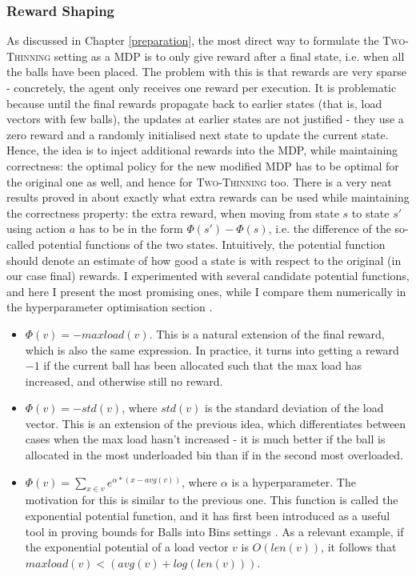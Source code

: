 \subsubsection{Reward Shaping} \label{rewardshaping}


As discussed in Chapter \ref{preparation}, the most direct way to formulate the \textsc{Two-Thinning} setting as a MDP is to only give reward after a final state, i.e. when all the balls have been placed. The problem with this is that rewards are very sparse - concretely, the agent only receives one reward per execution. It is problematic because until the final rewards propagate back to earlier states (that is, load vectors with few balls), the updates at earlier states are not justified - they use a zero reward and a randomly initialised next state to update the current state. Hence, the idea is to inject additional rewards into the MDP, while maintaining correctness: the optimal policy for the new modified MDP has to be optimal for the original one as well, and hence for \textsc{Two-Thinning} too. There is a very neat results proved in \cite{ng1999rewardshaping} about exactly what extra rewards can be used while maintaining the correctness property: the extra reward, when moving from state $s$ to state $s'$ using action $a$ has to be in the form $\Phi(s')-\Phi(s)$, i.e. the difference of the so-called potential functions of the two states. Intuitively, the potential function should denote an estimate of how good a state is with respect to the original (in our case final) rewards. I experimented with several candidate potential functions, and here I present the most promising ones, while I compare them numerically in the hyperparameter optimisation section .


\begin{itemize}
    \item
    $\Phi(v)=-maxload(v)$. This is a natural extension of the final reward, which is also the same expression. In practice, it turns into getting a reward $-1$ if the current ball has been allocated such that the max load has increased, and otherwise still no reward.
    \item
    $\Phi(v)=-std(v)$, where $std(v)$ is the standard deviation of the load vector. This is an extension of the previous idea, which differentiates between cases when the max load hasn't increased - it is much better if the ball is allocated in the most underloaded bin than if in the second most overloaded.
    \item
    $\Phi(v)=\sum_{x\in v} e^{\alpha * (x - avg(v))}$, where $\alpha$ is a hyperparameter. The motivation for this is similar to the previous one. This function is called the exponential potential function, and it has first been introduced as a useful tool in proving bounds for Balls into Bins settings \cite{ghosh1999exponentialpotential} . As a relevant example, if the exponential potential of a load vector $v$ is $O(len(v))$, it follows that $maxload(v) < (avg(v)+log(len(v)))$.
\end{itemize}


